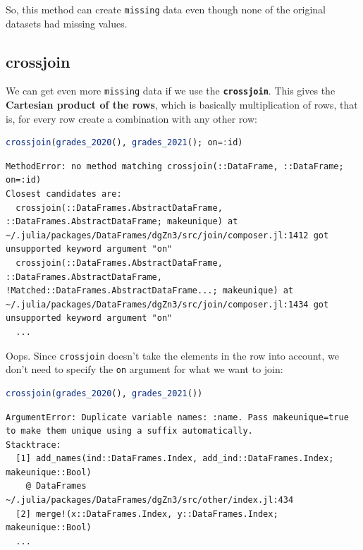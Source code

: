 \documentclass[
  notoc %
]{tufte-book}
\newcommand{\passthrough}[1]{#1}
\begin{document}
So, this method can create \passthrough{\lstinline!missing!} data even
though none of the original datasets had missing values.

\hypertarget{sec:crossjoin}{%
\subsection{crossjoin}\label{sec:crossjoin}}

We can get even more \passthrough{\lstinline!missing!} data if we use
the \textbf{\passthrough{\lstinline!crossjoin!}}. This gives the
\textbf{Cartesian product of the rows}, which is basically
multiplication of rows, that is, for every row create a combination with
any other row:

\begin{lstlisting}[language=Julia]
crossjoin(grades_2020(), grades_2021(); on=:id)
\end{lstlisting}

\begin{lstlisting}[language=Output]
MethodError: no method matching crossjoin(::DataFrame, ::DataFrame; on=:id)
Closest candidates are:
  crossjoin(::DataFrames.AbstractDataFrame, ::DataFrames.AbstractDataFrame; makeunique) at ~/.julia/packages/DataFrames/dgZn3/src/join/composer.jl:1412 got unsupported keyword argument "on"
  crossjoin(::DataFrames.AbstractDataFrame, ::DataFrames.AbstractDataFrame, !Matched::DataFrames.AbstractDataFrame...; makeunique) at ~/.julia/packages/DataFrames/dgZn3/src/join/composer.jl:1434 got unsupported keyword argument "on"
  ...
\end{lstlisting}

Oops. Since \passthrough{\lstinline!crossjoin!} doesn't take the
elements in the row into account, we don't need to specify the
\passthrough{\lstinline!on!} argument for what we want to join:

\begin{lstlisting}[language=Julia]
crossjoin(grades_2020(), grades_2021())
\end{lstlisting}

\begin{lstlisting}[language=Output]
ArgumentError: Duplicate variable names: :name. Pass makeunique=true to make them unique using a suffix automatically.
Stacktrace:
  [1] add_names(ind::DataFrames.Index, add_ind::DataFrames.Index; makeunique::Bool)
    @ DataFrames ~/.julia/packages/DataFrames/dgZn3/src/other/index.jl:434
  [2] merge!(x::DataFrames.Index, y::DataFrames.Index; makeunique::Bool)
  ...
\end{lstlisting}
\end{document}
